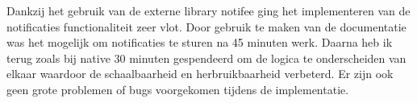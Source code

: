 Dankzij het gebruik van de externe library notifee ging het implementeren van de notificaties functionaliteit zeer vlot.
Door gebruik te maken van de documentatie was het mogelijk om notificaties te sturen na 45 minuten werk.
Daarna heb ik terug zoals bij native 30 minuten gespendeerd om de logica te onderscheiden van elkaar waardoor de schaalbaarheid 
en herbruikbaarheid verbeterd. Er zijn ook geen grote problemen of bugs voorgekomen tijdens de implementatie.
